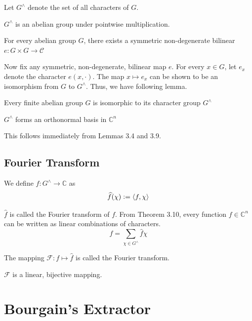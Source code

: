 \noindent Let $G^\land$ denote the set of all characters of $G$. 

\begin{lemma}
$G^\land$ is an abelian group under pointwise multiplication. 
\end{lemma}

\begin{lemma}
For every abelian group $G$, there exists a symmetric non-degenerate bilinear $e : G \times G \rightarrow \mathcal{C}$ 
\end{lemma}

Now fix any symmetric, non-degenerate, bilinear map $e$. For every $x \in G$, let $e_x$ denote the character $e(x,\cdot)$. The map $x \mapsto e_x$ can be shown to be an isomorphism from $G$ to $G^\land$. Thus, we have following lemma.

\begin{lemma}
Every finite abelian group $G$ is isomorphic to its character group $G^\land$
\end{lemma}

\begin{theorem}
$G^\land$ forms an orthonormal basis in $\mathbb{C}^n$
\end{theorem}
This follows immediately from Lemmas 3.4 and 3.9.
\section{Fourier Transform}
\begin{definition}
We define $\widehat{f} : G^\land \rightarrow \mathbb{C}$ as
$$\widehat{f}(\chi) \vcentcolon= \langle f, \chi \rangle $$
\end{definition}
$\widehat{f}$ is called the Fourier transform of $f$.
From Theorem 3.10, every function $f \in \mathbb{C}^n$ can be written as linear combinations of characters. 
$$f = \sum\limits_{\chi \in G^\land} \widehat{f} \chi$$

\begin{definition}
The mapping $\mathcal{F} : f \mapsto \widehat{f}$ is called the Fourier transform. 
\end{definition}

\begin{prop}
$\mathcal{F}$ is a linear, bijective mapping. 
\end{prop}

\chapter{Bourgain's Extractor}

